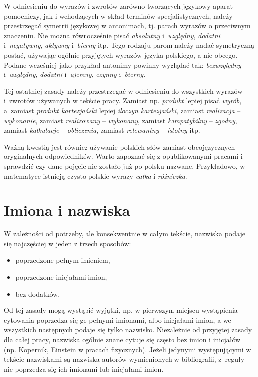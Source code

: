W odniesieniu do wyrazów i zwrotów zarówno tworzących językowy aparat pomocniczy, jak i wchodzących w skład terminów specjalistycznych, należy przestrzegać symetrii językowej w antonimach, tj. parach wyrazów o przeciwnym znaczeniu. Nie można równocześnie pisać  \textit{absolutny} i~\textit{względny},  \textit{dodatni} i~\textit{negatywny},  \textit{aktywny} i~\textit{bierny} itp. Tego rodzaju parom należy nadać symetryczną postać, używając ogólnie przyjętych wyrazów języka polskiego, a nie obcego. Podane wcześniej jako przykład antonimy powinny wyglądać tak:  \textit{bezwzględny} i~\textit{względny},  \textit{dodatni} i~\textit{ujemny},  \textit{czynny} i~\textit{bierny}.

Tej ostatniej zasady należy przestrzegać w odniesieniu do wszystkich wyrazów i~zwrotów używanych w tekście pracy. Zamiast np. \textit{produkt} lepiej pisać \textit{wyrób}, a~zamiast \textit{produkt kartezjański} lepiej \textit{iloczyn kartezjański}, zamiast \textit{realizacja} -- \textit{wykonanie}, zamiast \textit{realizowany} -- \textit{wykonany}, zamiast \textit{kompatybilny} -- \textit{zgodny}, zamiast \textit{kalkulacje} -- \textit{obliczenia}, zamiast \textit{relewantny} -- \textit{istotny} itp.


Ważną kwestią jest również używanie polskich słów zamiast obcojęzycznych oryginalnych odpowiedników. Warto zapoznać się z opublikowanymi pracami i sprawdzić czy dane pojęcie nie zostało już po polsku nazwane. Przykładowo, w matematyce istnieją czysto polskie wyrazy \textit{całka} i \textit{różniczka}.

\section{Imiona i nazwiska}
W zależności od potrzeby, ale konsekwentnie w całym tekście, nazwiska podaje się najczęściej w jeden z trzech sposobów:
\begin{itemize}
	\item poprzedzone pełnym imieniem,
	\item poprzedzone inicjałami imion,
	\item bez dodatków.
\end{itemize}
Od tej zasady mogą wystąpić wyjątki, np. w pierwszym miejscu wystąpienia cytowania poprzedza się go pełnymi imionami, albo inicjałami imion, a we wszystkich następnych podaje się tylko nazwisko. Niezależnie od przyjętej zasady dla całej pracy, nazwiska ogólnie znane cytuje się często bez imion i inicjałów (np. Kopernik, Einstein w pracach fizycznych). Jeżeli jedynymi występującymi w tekście nazwiskami są nazwiska autorów wymienionych w bibliografii, z~reguły nie poprzedza się ich imionami lub inicjałami imion.

